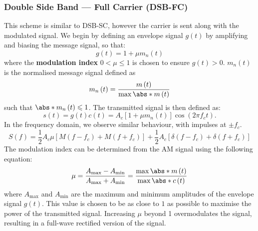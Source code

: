 \documentclass{article}
\begin{document}
\subsubsection{Double Side Band --- Full Carrier (DSB-FC)}
This scheme is similar to DSB-SC, however the carrier is sent along
with the modulated signal. We begin by defining an envelope signal
\(g\left( t \right)\) by amplifying and biasing the message signal, so
that:
\begin{equation*}
    g\left( t \right) = 1 + \mu m_n\left( t \right)
\end{equation*}
where the \textbf{modulation index} \(0 < \mu \leqslant 1\) is chosen to
ensure \(g\left( t \right) > 0\).
\(m_n\left( t \right)\) is the normalised message signal defined as
\begin{equation*}
    m_n\left( t \right) = \frac{m\left( t \right)}{\max{\abs*{m\left( t \right)}}}
\end{equation*}
such that \(\abs*{m_n\left( t \right)} \leqslant 1\).
The transmitted signal is then defined as:
\begin{equation*}
    s\left( t \right) = g\left( t \right) c\left( t \right) = A_c \left[ 1 + \mu m_n\left( t \right) \right] \cos{\left( 2 \pi f_c t \right)}.
\end{equation*}
In the frequency domain, we observe similar behaviour, with impulses at
\(\pm f_c\).
\begin{equation*}
    S\left( f \right) = \frac{1}{2} A_c \mu \left[ M\left( f - f_c \right) + M\left( f + f_c \right) \right] + \frac{1}{2} A_c \left[ \delta\left( f - f_c \right) + \delta\left( f + f_c \right) \right]
\end{equation*}
The modulation index can be determined from the AM signal using the
following equation:
\begin{equation*}
    \mu = \frac{A_{\mathrm{max}} - A_{\mathrm{min}}}{A_{\mathrm{max}} + A_{\mathrm{min}}} = \frac{\max{\abs*{m\left( t \right)}}}{\max{\abs*{c\left( t \right)}}} %
\end{equation*}
where \(A_{\mathrm{max}}\) and \(A_{\mathrm{min}}\) are the maximum and %
minimum amplitudes of the envelope signal \(g\left( t \right)\). This
value is chosen to be as close to \(1\) as possible to maximise the
power of the transmitted signal. Increasing \(\mu\) beyond 1
overmodulates the signal, resulting in a full-wave rectified version of
the signal.
\end{document}

